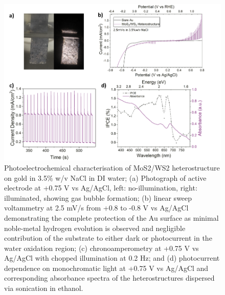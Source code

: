 \begin{figure}[h]
	\begin{center}
		\includegraphics[scale=0.3]{Heterostructures/CyclicVoltammetry.png}
		\caption{Photoelectrochemical characterisation of MoS2/WS2 heterostructure on gold in 3.5\% w/v NaCl in DI water; (a) Photograph of active electrode at +0.75 V vs Ag/AgCl, left: no-illumination, right: illuminated, showing gas bubble formation; (b) linear sweep voltammetry at 2.5 mV/s from +0.8 to -0.8 V vs Ag/AgCl demonstrating the complete protection of the Au surface as minimal noble-metal hydrogen evolution is observed and negligible contribution of the substrate to either dark or photocurrent in the water oxidation region; (c) chronoamperometry at +0.75 V vs Ag/AgCl with chopped illumination at 0.2 Hz; and (d) photocurrent dependence on monochromatic light at +0.75 V vs Ag/AgCl and corresponding absorbance spectra of the heterostructures dispersed via sonication in ethanol.}
		\label{fig:HeterostructuresCyclicVoltammetry}
	\end{center}
\end{figure}

